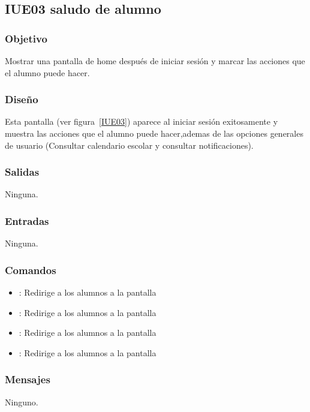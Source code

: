 \subsection{IUE03 saludo de alumno}

\subsubsection{Objetivo}
Mostrar una pantalla de home después de iniciar sesión y marcar las acciones que el alumno puede hacer.

\subsubsection{Diseño}
Esta pantalla  (ver figura~\ref{IUE03}) aparece al iniciar sesión exitosamente y muestra las acciones que el alumno puede hacer,ademas de las opciones generales de usuario (Consultar calendario escolar y consultar notificaciones). 


\subsubsection{Salidas}

Ninguna.

\subsubsection{Entradas}
Ninguna.

\subsubsection{Comandos}
\begin{itemize}
	\item {}: Redirige a los alumnos a la pantalla 
	\item {}: Redirige a los alumnos a la pantalla 
	\item {}: Redirige a los alumnos a la pantalla 
	\item {}: Redirige a los alumnos a la pantalla 
	
\end{itemize}

\subsubsection{Mensajes}

\begin{Citemize}
	\item Ninguno.
\end{Citemize}

